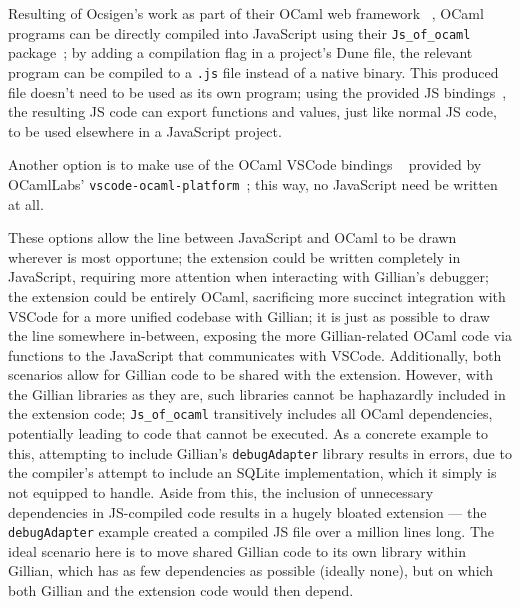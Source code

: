 Resulting of Ocsigen's work as part of their OCaml web framework
~\cite{ocsigen-framework}, OCaml programs can be directly compiled into
JavaScript using their \texttt{Js\_of\_ocaml} package~\cite{js-of-ocaml}; by
adding a compilation flag in a project's Dune file, the relevant program can be
compiled to a \texttt{.js} file instead of a native binary. This produced file
doesn't need to be used as its own program; using the provided JS
bindings~\cite{js-of-ocaml-bindings}, the resulting JS code can export
functions and values, just like normal JS code, to be used elsewhere in a
JavaScript project.

Another option is to make use of the OCaml VSCode bindings
~\cite{vscode-ocaml-bindings} provided by OCamlLabs'
\texttt{vscode-ocaml-platform}~\cite{vscode-ocaml-platform, ocamllabs}; this
way, no JavaScript need be written at all.

These options allow the line between JavaScript and OCaml to be drawn wherever
is most opportune; the extension could be written completely in JavaScript,
requiring more attention when interacting with Gillian's debugger; the
extension could be entirely OCaml, sacrificing more succinct integration with
VSCode for a more unified codebase with Gillian; it is just as possible to draw
the line somewhere in-between, exposing the more Gillian-related OCaml code via
functions to the JavaScript that communicates with VSCode. Additionally, both
scenarios allow for Gillian code to be shared with the extension. However,
with the Gillian libraries as they are, such libraries cannot be haphazardly
included in the extension code; \texttt{Js\_of\_ocaml} transitively includes all
OCaml dependencies, potentially leading to code that cannot be executed. As a
concrete example to this, attempting to include Gillian's \texttt{debugAdapter}
library results in errors, due to the compiler's attempt to include an SQLite
implementation, which it simply is not equipped to handle. Aside from this, the
inclusion of unnecessary dependencies in JS-compiled code results in a hugely
bloated extension --- the \texttt{debugAdapter} example created a compiled JS
file over a million lines long. The ideal scenario here is to move shared
Gillian code to its own library within Gillian, which has as few dependencies as
possible (ideally none), but on which both Gillian and the extension code would
then depend.

